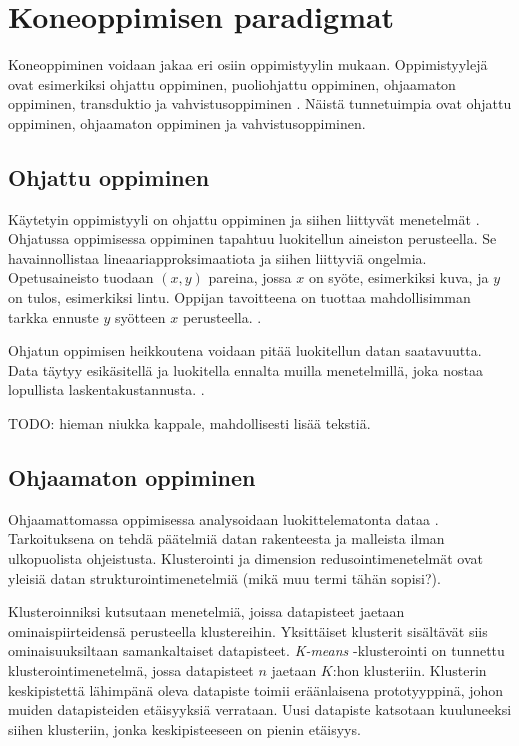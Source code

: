 \documentclass[utf8]{gradu3}
\begin{document}
\section{Koneoppimisen paradigmat}

Koneoppiminen voidaan jakaa eri osiin oppimistyylin mukaan. Oppimistyylejä ovat esimerkiksi ohjattu oppiminen, puoliohjattu oppiminen, ohjaamaton oppiminen, transduktio ja vahvistusoppiminen \parencite{das2017survey}. Näistä tunnetuimpia ovat ohjattu oppiminen, ohjaamaton oppiminen ja vahvistusoppiminen.

\subsection{Ohjattu oppiminen}

Käytetyin oppimistyyli on ohjattu oppiminen ja siihen liittyvät menetelmät \parencite{jordan2015machine}. Ohjatussa oppimisessa oppiminen tapahtuu luokitellun aineiston perusteella. Se havainnollistaa lineaariapproksimaatiota ja siihen liittyviä ongelmia. Opetusaineisto tuodaan \((x,y)\) pareina, jossa \(x\) on syöte, esimerkiksi kuva, ja \(y\) on tulos, esimerkiksi lintu. Oppijan tavoitteena on tuottaa mahdollisimman tarkka ennuste \(y\) syötteen \(x\) perusteella. \parencite{jordan2015machine}.

Ohjatun oppimisen heikkoutena voidaan pitää luokitellun datan saatavuutta. Data täytyy esikäsitellä ja luokitella ennalta muilla menetelmillä, joka nostaa lopullista laskentakustannusta. \parencite{das2017survey}.

TODO: hieman niukka kappale, mahdollisesti lisää tekstiä.

\subsection{Ohjaamaton oppiminen}

Ohjaamattomassa oppimisessa analysoidaan luokittelematonta dataa \parencite{das2017survey,jordan2015machine}. Tarkoituksena on tehdä päätelmiä datan rakenteesta ja malleista ilman ulkopuolista ohjeistusta. Klusterointi ja dimension redusointimenetelmät ovat yleisiä datan strukturointimenetelmiä (mikä muu termi tähän sopisi?).

Klusteroinniksi kutsutaan menetelmiä, joissa datapisteet jaetaan ominaispiirteidensä perusteella klustereihin. Yksittäiset klusterit sisältävät siis ominaisuuksiltaan samankaltaiset datapisteet. \textit{K-means} -klusterointi on tunnettu klusterointimenetelmä, jossa datapisteet \(n\) jaetaan \(K\):hon klusteriin. Klusterin keskipistettä lähimpänä oleva datapiste toimii eräänlaisena prototyyppinä, johon muiden datapisteiden etäisyyksiä verrataan. Uusi datapiste katsotaan kuuluneeksi siihen klusteriin, jonka keskipisteeseen on pienin etäisyys.
\end{document}
